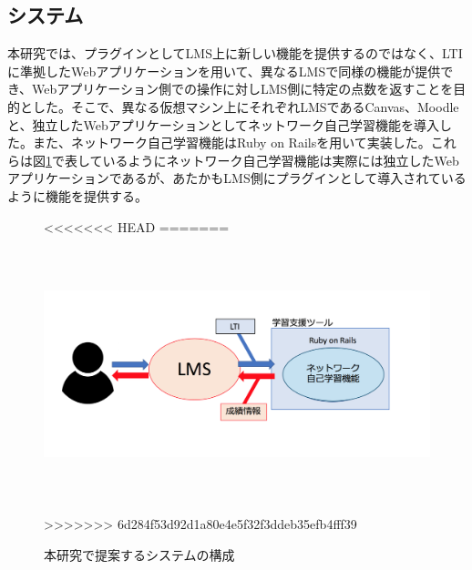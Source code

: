 \subsection{システム}
\label{tag:function}
本研究では、プラグインとしてLMS上に新しい機能を提供するのではなく、LTIに準拠したWebアプリケーションを用いて、異なるLMSで同様の機能が提供でき、Webアプリケーション側での操作に対しLMS側に特定の点数を返すことを目的とした。そこで、異なる仮想マシン上にそれぞれLMSであるCanvas、Moodleと、独立したWebアプリケーションとしてネットワーク自己学習機能を導入した。また、ネットワーク自己学習機能はRuby on Railsを用いて実装した。これらは図\ref{fig:virtualMachine}で表しているようにネットワーク自己学習機能は実際には独立したWebアプリケーションであるが、あたかもLMS側にプラグインとして導入されているように機能を提供する。

\begin{figure}[htbp]
  \begin{center}
<<<<<<< HEAD
=======
    \includegraphics[clip,width=12.0cm,height=8.0cm]{img/system2.png}
>>>>>>> 6d284f53d92d1a80e4e5f32f3ddeb35efb4fff39
    \caption{本研究で提案するシステムの構成}
    \label{fig:virtualMachine}
  \end{center}
\end{figure}



